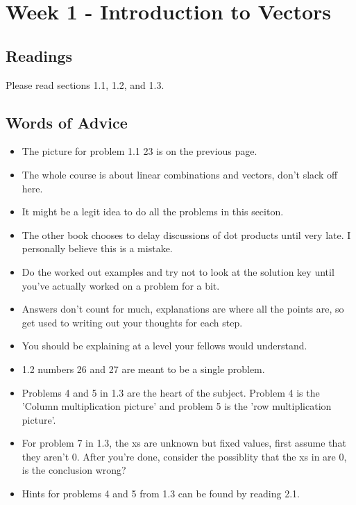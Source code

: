 

	\section{Week 1 - Introduction to Vectors}

	\subsection{Readings}
		Please read sections 1.1, 1.2, and 1.3.

	\subsection{Words of Advice}
		\begin{itemize}
			\item The picture for problem 1.1 23 is on the previous page.
			\item The whole course is about linear combinations and vectors, don't slack off here.
			\item It might be a legit idea to do all the problems in this seciton.
			\item The other book chooses to delay discussions of dot products until very late. I personally believe this is a mistake.
			\item Do the worked out examples and try not to look at the solution key until you've actually worked on a problem for a bit.
			\item Answers don't count for much, explanations are where all the points are, so get used to writing out your thoughts for each step.
			\item You should be explaining at a level your fellows would understand.
			\item 1.2 numbers 26 and 27 are meant to be a single problem.
			\item Problems 4 and 5 in 1.3 are the heart of the subject. Problem 4 is the 'Column multiplication picture' and problem 5 is the 'row multiplication picture'.
			\item For problem 7 in 1.3, the xs are unknown but fixed values, first assume that they aren't 0. After you're done, consider the possiblity that the xs in  are 0, is the conclusion wrong? 
			\item Hints for problems 4 and 5 from 1.3 can be found by reading 2.1.
		\end{itemize}

